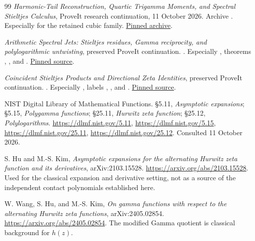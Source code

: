 \begin{thebibliography}{99}
\emph{Harmonic-Tail Reconstruction, Quartic Trigamma Moments, and Spectral
Stieltjes Calculus}, ProveIt research continuation, 11 October 2026.
Archive .
Especially  for the retained cubic family.
\href{https://github.com/VladimirReshetnikov/ProveIt/blob/e3d7ec5d3f9be259c1f91edaea4389f4e79b5b03/docs/incoming/ProveIt_Quartic_Spectral_Reconstruction_2026-10-11.zip}{Pinned archive}.

\emph{Arithmetic Spectral Jets: Stieltjes residues, Gamma reciprocity,
and polylogarithmic untwisting}, preserved ProveIt continuation.
.
Especially , theorems
, , and
.
\href{https://github.com/VladimirReshetnikov/ProveIt/blob/e3d7ec5d3f9be259c1f91edaea4389f4e79b5b03/Analysis/Polylogarithms/docs/reports/stieltjes-harmonic-resonance/continuations/arithmetic-spectral-jets/sections/03-local.tex}{Pinned source}.

\emph{Coincident Stieltjes Products and Directional Zeta Identities},
preserved ProveIt continuation.
.
Especially , labels
, , and .
\href{https://github.com/VladimirReshetnikov/ProveIt/blob/e3d7ec5d3f9be259c1f91edaea4389f4e79b5b03/Analysis/Polylogarithms/docs/reports/stieltjes-correlation-calculus/continuations/coincident-directional-zeta/sections/02_cubic.tex}{Pinned source}.

NIST Digital Library of Mathematical Functions.
\S5.11, \emph{Asymptotic expansions};
\S5.15, \emph{Polygamma functions};
\S25.11, \emph{Hurwitz zeta function};
\S25.12, \emph{Polylogarithms}.
\url{https://dlmf.nist.gov/5.11},
\url{https://dlmf.nist.gov/5.15},
\url{https://dlmf.nist.gov/25.11},
\url{https://dlmf.nist.gov/25.12}.
Consulted 11 October 2026.

S. Hu and M.-S. Kim,
\emph{Asymptotic expansions for the alternating Hurwitz zeta function
and its derivatives}, arXiv:2103.15528.
\url{https://arxiv.org/abs/2103.15528}.
Used for the classical expansion and derivative setting, not as a source
of the independent contact polynomials established here.

W. Wang, S. Hu, and M.-S. Kim,
\emph{On gamma functions with respect to the alternating Hurwitz zeta
functions}, arXiv:2405.02854.
\url{https://arxiv.org/abs/2405.02854}.
The modified Gamma quotient is classical background for \(h(z)\).


\end{thebibliography}

